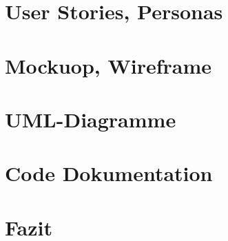 \documentclass{article}
\begin{document}
\section{User Stories, Personas}

\section{Mockuop, Wireframe}

\section{UML-Diagramme}

\section{Code Dokumentation}

\section{Fazit}
\end{document}
